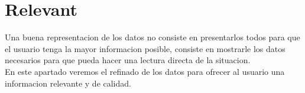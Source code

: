 \newpage
\section{Relevant}
 
Una buena representacion de los datos no consiste en presentarlos todos para que el usuario tenga la mayor informacion posible,
consiste en mostrarle los datos necesarios para que pueda hacer una lectura directa de la situacion.\\

En este apartado veremos el refinado de los datos para ofrecer al usuario una informacion relevante y de calidad.






\begin{figure}[ht]
    \centering
    \end{figure}